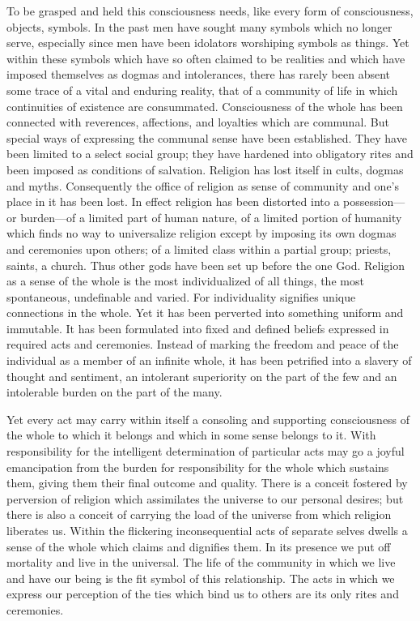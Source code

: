 To be grasped and held this consciousness needs, like every form of
consciousness, objects, symbols. In the past men have sought many
symbols which no longer serve, especially since men have been
idolators worshiping symbols as things. Yet within these symbols which
have so often claimed to be realities and which have imposed
themselves as dogmas and intolerances, there has rarely been absent
some trace of a vital and enduring reality, that of a community of
life in which continuities of existence are consummated. Consciousness
of the whole has been connected with reverences, affections, and
loyalties which are communal. But special ways of expressing the
communal sense have been established. They have been limited to a
select social group; they have hardened into obligatory rites and been
imposed as conditions of salvation. Religion has lost itself in cults,
dogmas and myths. Consequently the office of religion as sense of
community and one's place in it has been lost. In effect religion has
been distorted into a pos\-ses\-sion---or bur\-den---of a limited part
of  human nature, of a limited portion of humanity which
finds no way to universalize religion except by imposing its own
dogmas and ceremonies upon others; of a limited class within a partial
group; priests, saints, a church. Thus other gods have been set up
before the one God. Religion as a sense of the whole is the most
individualized of all things, the most spontaneous, undefinable and
varied. For individuality signifies unique connections in the whole.
Yet it has been perverted into something uniform and immutable. It has
been formulated into fixed and defined beliefs expressed in required
acts and ceremonies. Instead of marking the freedom and peace of the
individual as a member of an infinite whole, it has been petrified
into a slavery of thought and sentiment, an intolerant superiority on
the part of the few and an intolerable burden on the part of the many.

Yet every act may carry within itself a consoling and supporting
consciousness of the whole to which it belongs and which in some sense
belongs to it. With responsibility for the intelligent determination
of particular acts may go a joyful emancipation from the burden for
responsibility for the whole which sustains them, giving them their
final outcome and quality. There is a conceit fostered by perversion
of religion which assimilates the universe to our personal desires;
but there is also a conceit of carrying the load of the universe from
which religion liberates us. Within the flickering inconsequential
acts of separate selves dwells a sense of the whole which claims and
dignifies them.  In its presence we put off mortality and
live in the universal. The life of the community in which we live and
have our being is the fit symbol of this relationship. The acts in
which we express our perception of the ties which bind us to others
are its only rites and ceremonies.

